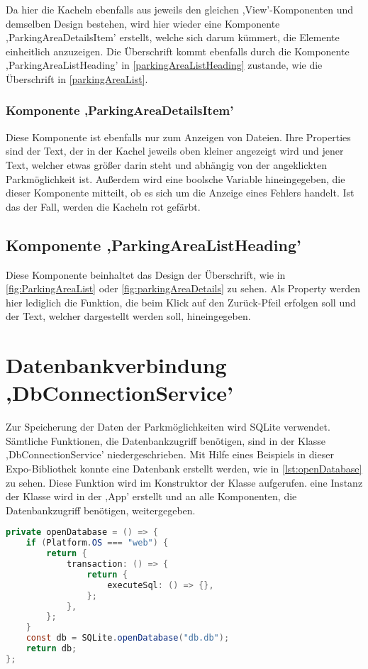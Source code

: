 Da hier die Kacheln ebenfalls aus jeweils den gleichen ,View'-Komponenten und demselben Design bestehen, wird hier wieder eine Komponente ,ParkingAreaDetailsItem' erstellt, welche sich darum kümmert, die Elemente einheitlich anzuzeigen. Die Überschrift kommt ebenfalls durch die Komponente ,ParkingAreaListHeading' in \autoref{parkingAreaListHeading} zustande, wie die Überschrift in \autoref{parkingAreaList}.

\subsubsection{Komponente ,ParkingAreaDetailsItem'}
Diese Komponente ist ebenfalls nur zum Anzeigen von Dateien. Ihre Properties sind der Text, der in der Kachel jeweils oben kleiner angezeigt wird und jener Text, welcher etwas größer darin steht und abhängig von der angeklickten Parkmöglichkeit ist. Außerdem wird eine boolsche Variable hineingegeben, die dieser Komponente mitteilt, ob es sich um die Anzeige eines Fehlers handelt. Ist das der Fall, werden die Kacheln rot gefärbt.

\subsection{Komponente ,ParkingAreaListHeading'}
\label{parkingAreaListHeading}
Diese Komponente beinhaltet das Design der Überschrift, wie in \autoref{fig:ParkingAreaList} oder \autoref{fig:parkingAreaDetails} zu sehen. Als Property werden hier lediglich die Funktion, die beim Klick auf den Zurück-Pfeil erfolgen soll und der Text, welcher dargestellt werden soll, hineingegeben.

\section{Datenbankverbindung ,DbConnectionService'}
Zur Speicherung der Daten der Parkmöglichkeiten wird SQLite verwendet. Sämtliche Funktionen, die Datenbankzugriff benötigen, sind in der Klasse ,DbConnectionService' niedergeschrieben. Mit Hilfe eines Beispiels in dieser Expo-Bibliothek konnte eine Datenbank erstellt werden, wie in \autoref{lst:openDatabase} zu sehen. Diese Funktion wird im Konstruktor der Klasse aufgerufen. eine Instanz der Klasse wird in der ,App' erstellt und an alle Komponenten, die Datenbankzugriff benötigen, weitergegeben.

\begin{lstlisting}[caption={Das Erstellen einer Datenbank mit Hilfe eines Beispiels der genutzten Expo-Bibliothek SQLite. (Quelle: \cite{sqlite})},captionpos=b, language=Java, label=lst:openDatabase]
private openDatabase = () => {
	if (Platform.OS === "web") {
		return {
			transaction: () => {
				return {
					executeSql: () => {},
				};
			},
		};
	}
	const db = SQLite.openDatabase("db.db");
	return db;
};
\end{lstlisting}

